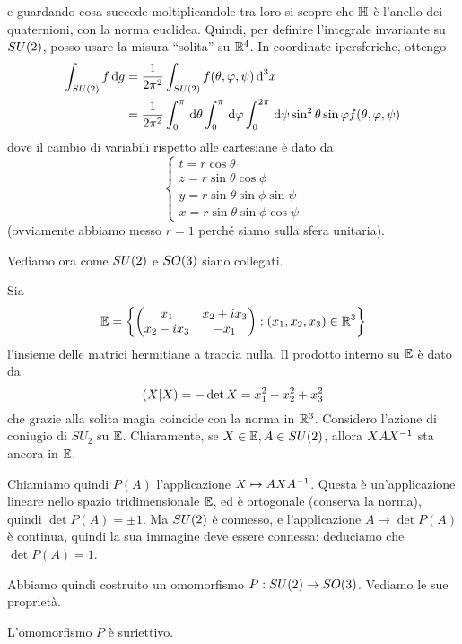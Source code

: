 		e guardando cosa succede moltiplicandole tra loro si scopre che $\mathbb H$ è l'anello dei quaternioni, con la norma euclidea. Quindi, per definire l'integrale invariante su $SU(2)$, posso usare la misura ``solita'' su $\mathbb R^4$. In coordinate ipersferiche, ottengo
		\begin{align}
			\int_{SU(2)} f \, \textrm{d} g &= \frac1{2\pi^2}\int_{SU(2)}f(\theta, \varphi, \psi)\, \textrm{d}^3x \\
			&= \frac1{2\pi^2}\int_0^\pi \, \textrm{d} \theta \int_0^\pi \, \textrm{d} \varphi \int_0^{2\pi} \, \textrm{d} \psi \sin^2 \theta \sin \varphi f(\theta, \varphi, \psi)
		\end{align}
		dove il cambio di variabili rispetto alle cartesiane è dato da 
		\[
			\begin{cases}
			t=r\cos\theta \\
			z=r\sin\theta \cos\phi \\
			y=r\sin\theta \sin \phi \sin \psi \\
			x=r\sin\theta \sin \phi \cos \psi 
			\end{cases}
		\]
		(ovviamente abbiamo messo $r=1$ perché siamo sulla sfera unitaria).

		Vediamo ora come $SU(2)$ e $SO(3)$ siano collegati.

				
		
			Sia \[
				\mathbb E=\left\{\left(
					\begin{matrix}
						x_1	& x_2+ix_3 \\
						x_2-ix_3 & -x_1 
					\end{matrix}
				\right): (x_1,x_2,x_3) \in \mathbb R^3\right\}
			\] l'insieme delle matrici hermitiane a traccia nulla. Il prodotto interno su $\mathbb E$ è dato da 
			\[
			 \left(X | X\right) = -\det X = x_1^2+x_2^2+x_3^2
			\]
			che grazie alla solita magia coincide con la norma in $\mathbb R^3$. 
			Considero l'azione di coniugio di $SU_2$ su $\mathbb E$. Chiaramente, se $X\in \mathbb E, A\in SU(2)$, allora $XAX^{-1}$ sta ancora in $\mathbb E$. 
			
			Chiamiamo quindi $P(A)$ l'applicazione $X \mapsto AXA^{-1}$. Questa è un'applicazione lineare nello spazio tridimensionale $\mathbb E$, ed è ortogonale (conserva la norma), quindi $\det P(A)=\pm1$. Ma $SU(2)$ è connesso, e l'applicazione $A \mapsto \det P(A)$ è continua, quindi la sua immagine deve essere connessa: deduciamo che $\det P(A)=1$.
			
			Abbiamo quindi costruito un omomorfismo $P: SU(2) \rightarrow SO(3)$. Vediamo le sue proprietà.
			
			\begin{myprop}
				L'omomorfismo $P$ è suriettivo.
			\end{myprop}
			
